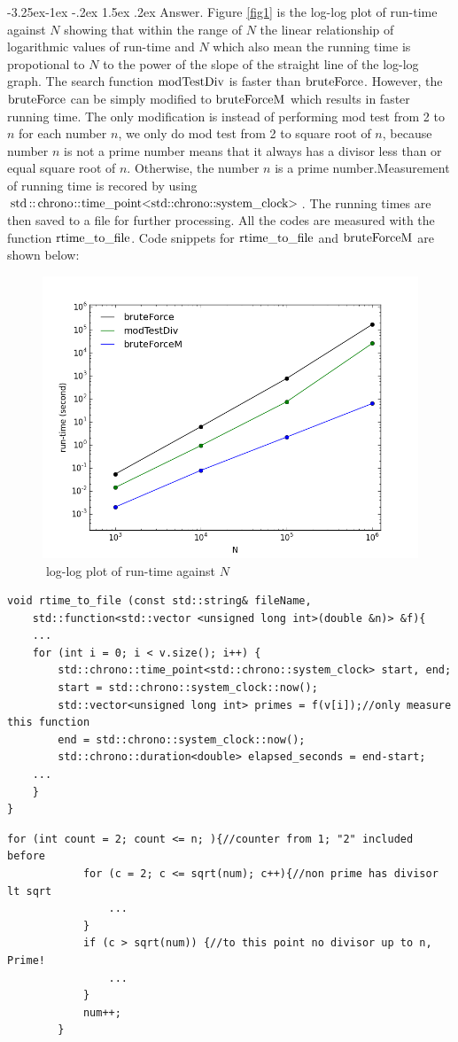 \documentclass[a4paper,12pt]{article}%
\makeatletter
\renewcommand\subsubsection{\@startsection{subsection}{2}{\z@}%
                                     {-3.25ex\@plus -1ex \@minus -.2ex}%
                                     {1.5ex \@plus .2ex}%
                                     {\normalfont\bfseries\itshape}}%
\makeatother
\begin{document}
\subsubsection{Answer.}
Figure \eqref{fig1} is the log-log plot of run-time against $N$ showing that within the range of $N$ the linear relationship of logarithmic values of run-time and $N$ which also mean the running time is propotional to $N$ to the power of the slope of the straight line of the log-log graph. The search function $\lstinline{modTestDiv}$ is faster than $\lstinline{bruteForce}$. However, the $\lstinline{bruteForce}$ can be simply modified to $\lstinline{bruteForceM}$ which results in faster running time. The only modification is instead of performing mod test from 2 to $n$ for each number $n$, we only do mod test from 2 to square root of $n$, because number $n$ is not a prime number means that it always has a divisor less than or equal square root of $n$. Otherwise, the number $n$ is a prime number.Measurement of running time is recored by using $\lstinline{std::chrono::time_point<std::chrono::system_clock>}$. The running times are then saved to a file for further processing. All the codes are measured with the function $\lstinline{rtime_to_file}$. Code snippets for  $\lstinline{rtime_to_file}$ and $\lstinline{bruteForceM}$  are shown below:
\begin{figure}[h]
\centering
\includegraphics[width=0.8\linewidth, height=0.5\linewidth]{rt-vs-n.png}
\caption{log-log plot of run-time against $N$}
\label{fig1}
\end{figure}
\begin{lstlisting}[title = $\lstinline{rtime_to_file}$]
void rtime_to_file (const std::string& fileName, 
    std::function<std::vector <unsigned long int>(double &n)> &f){    
 	...
    for (int i = 0; i < v.size(); i++) {
        std::chrono::time_point<std::chrono::system_clock> start, end;
        start = std::chrono::system_clock::now();
        std::vector<unsigned long int> primes = f(v[i]);//only measure this function
        end = std::chrono::system_clock::now();
        std::chrono::duration<double> elapsed_seconds = end-start;
 	...    
    }
}
\end{lstlisting}
\begin{lstlisting}[title = $\lstinline{bruteForceM}$]
for (int count = 2; count <= n; ){//counter from 1; "2" included before
            for (c = 2; c <= sqrt(num); c++){//non prime has divisor lt sqrt
                ...
            }
            if (c > sqrt(num)) {//to this point no divisor up to n, Prime!
                ...
            }
            num++;  
        }
\end{lstlisting}
\end{document}
